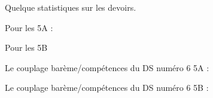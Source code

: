 
Quelque statistiques sur les devoirs.

\vfill

Pour les 5A :


\begin{center}
   
\end{center}

\vfill

Pour les 5B

\begin{center}
   
\end{center}


Le couplage barème/compétences du DS numéro 6 5A :

\begin{center}
   
\end{center}


Le couplage barème/compétences du DS numéro 6 5B :

\begin{center}
   
\end{center}
